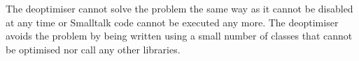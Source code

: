 \documentclass[a4paper,12pt,twoside]{../includes/ThesisStyle}
\begin{document}
The deoptimiser cannot solve the problem the same way as it cannot be disabled at any time or Smalltalk code cannot be executed any more. The deoptimiser avoids the problem by being written using a small number of classes that cannot be optimised nor call any other libraries.

\ifx\wholebook\relax\else
    
\end{document}
